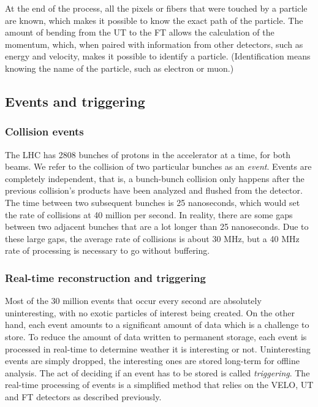 \documentclass[12pt]{article}
\begin{document}
At the end of the process, all the pixels or fibers that were touched by a particle are known, which makes it possible to know the exact path of the particle. The amount of bending from the UT to the FT allows the calculation of the momentum, which, when paired with information from other detectors, such as energy and velocity, makes it possible to identify a particle. (Identification means knowing the name of the particle, such as electron or muon.)


\subsection{Events and triggering}\label{sec_events_trigger}


\subsubsection{Collision events}\label{sec_event_what}

The LHC has 2808 bunches of protons in the accelerator at a time, for both beams. We refer to the collision of two particular bunches as an \textit{event}. Events are completely independent, that is, a bunch-bunch collision only happens after the previous collision's products have been analyzed and flushed from the detector. The time between two subsequent bunches is 25 nanoseconds, which would set the rate of collisions at 40 million per second. In reality, there are some gaps between two adjacent bunches that are a lot longer than 25 nanoseconds. Due to these large gaps, the average rate of collisions is about 30 MHz, but a 40 MHz rate of processing is necessary to go without buffering.


\subsubsection{Real-time reconstruction and triggering}\label{sec_trigger_what}

Most of the 30 million events that occur every second are absolutely uninteresting, with no exotic particles of interest being created. On the other hand, each event amounts to a significant amount of data which is a challenge to store. To reduce the amount of data written to permanent storage, each event is processed in real-time to determine weather it is interesting or not. Uninteresting events are simply dropped, the interesting ones are stored long-term for offline analysis. The act of deciding if an event has to be stored is called \textit{triggering}. The real-time processing of events is a simplified method that relies on the VELO, UT and FT detectors as described previously.
\end{document}

